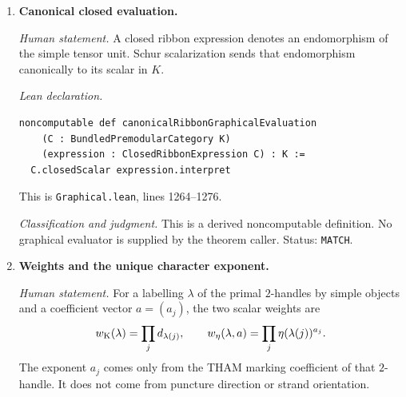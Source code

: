 \begin{enumerate}[label=\textbf{E\arabic*.},leftmargin=*]
\emph{Human statement.}
For a fixed ordinary-component labelling, cups, caps, crossings, twists, and
planar continuations compile to their standard ribbon morphisms.  A
\texttt{projectorHole} compiles instead to the tensor-unit projector on the
ordered tensor product of all strands crossing that dotted disk.  The complete
closed morphism is obtained by composing these events in sweep order.

\emph{Lean declaration.}
The local definition is \texttt{compileCutOpenEventMorphism}; its
\texttt{projectorHole} branch is at \nolinkurl{Evaluator.lean}, lines
587--598.  Exact common exterior contexts are added by
\nolinkurl{compileRoleAwareContextualCutOpenEventMorphism}, and the full closed
morphism is \nolinkurl{compileCutOpenExteriorMorphism}, lines 985--1083.

\emph{Classification and judgment.}
This is the canonical compiler from the already audited finite cut-open
syntax.  Literal dotted components are never summed over ordinary Kirby
colours.  The compiler is a definition, not an input or soundness axiom.
Status: \texttt{MATCH}.

\item \textbf{Canonical closed evaluation.}

\emph{Human statement.}
A closed ribbon expression denotes an endomorphism of the simple tensor unit.
Schur scalarization sends that endomorphism canonically to its scalar in $K$.

\emph{Lean declaration.}
\begin{verbatim}
noncomputable def canonicalRibbonGraphicalEvaluation
    (C : BundledPremodularCategory K)
    (expression : ClosedRibbonExpression C) : K :=
  C.closedScalar expression.interpret
\end{verbatim}
This is \nolinkurl{Graphical.lean}, lines 1264--1276.

\emph{Classification and judgment.}
This is a derived noncomputable definition.  No graphical evaluator is
supplied by the theorem caller.  Status: \texttt{MATCH}.

\item \textbf{Weights and the unique character exponent.}

\emph{Human statement.}
For a labelling $\lambda$ of the primal $2$-handles by simple objects and a
coefficient vector $a=(a_j)$, the two scalar weights are
\[
 w_{\rm K}(\lambda)=\prod_j d_{\lambda(j)},\qquad
 w_\eta(\lambda,a)=\prod_j\eta(\lambda(j))^{a_j}.
\]
The exponent $a_j$ comes only from the THAM marking coefficient of that
$2$-handle.  It does not come from puncture direction or strand orientation.


\end{enumerate}
